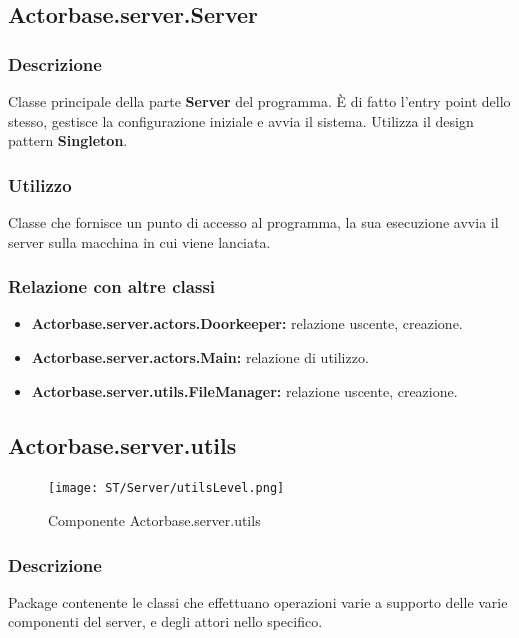 \documentclass[a4paper]{article}
\begin{document}
		\subsection{Actorbase.server.Server}
			\subsubsection{Descrizione}
				Classe principale della parte \textbf{Server} del programma. È di fatto l'entry point dello stesso, gestisce la configurazione 
				iniziale e avvia il sistema. Utilizza il design pattern \textbf{Singleton}.
				
			\subsubsection{Utilizzo}
				Classe che fornisce un punto di accesso al programma, la sua esecuzione avvia il server sulla macchina in cui viene lanciata.
				
			\subsubsection{Relazione con altre classi}
				\begin{itemize}
					\item \textbf{Actorbase.server.actors.Doorkeeper:} relazione uscente, creazione.
					\item \textbf{Actorbase.server.actors.Main:} relazione di utilizzo.
					\item \textbf{Actorbase.server.utils.FileManager:} relazione uscente, creazione.
				\end{itemize}
				
		\subsection{Actorbase.server.utils}
		
			\begin{figure} [H]
				\centering
				\texttt{[image: ST/Server/utilsLevel.png]}
				\caption{Componente Actorbase.server.utils}
			\end{figure}
			
			\subsubsection{Descrizione}
				Package contenente le classi che effettuano operazioni varie a supporto delle varie componenti del server, e degli attori nello specifico.
				
\end{document}
